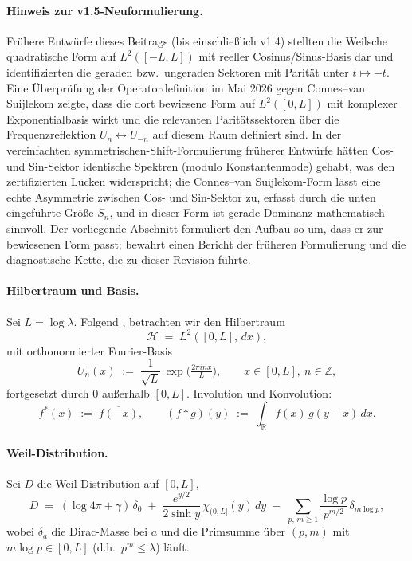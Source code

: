 \documentclass[11pt,a4paper]{article}
\theoremstyle{remark}
\theoremstyle{plain}
\begin{document}
\paragraph{Hinweis zur v1.5-Neuformulierung.}
Frühere Entwürfe dieses Beitrags (bis einschließlich v1.4) stellten die Weilsche quadratische Form auf $L^2([-L,L])$ mit reeller Cosinus/Sinus-Basis dar und identifizierten die geraden bzw.\ ungeraden Sektoren mit Parität unter $t\mapsto -t$. Eine Überprüfung der Operatordefinition im Mai 2026 gegen Connes--van Suijlekom \cite{ConnesvS2025} zeigte, dass die dort bewiesene Form auf $L^2([0,L])$ mit komplexer Exponentialbasis wirkt und die relevanten Paritätssektoren über die Frequenzreflektion $U_n\leftrightarrow U_{-n}$ auf diesem Raum definiert sind. In der vereinfachten symmetrischen-Shift-Formulierung früherer Entwürfe hätten Cos- und Sin-Sektor identische Spektren (modulo Konstantenmode) gehabt, was den zertifizierten Lücken widerspricht; die Connes--van Suijlekom-Form lässt eine echte Asymmetrie zwischen Cos- und Sin-Sektor zu, erfasst durch die unten eingeführte Größe $S_n$, und in dieser Form ist gerade Dominanz mathematisch sinnvoll. Der vorliegende Abschnitt formuliert den Aufbau so um, dass er zur bewiesenen Form passt;  bewahrt einen Bericht der früheren Formulierung und die diagnostische Kette, die zu dieser Revision führte.

\paragraph{Hilbertraum und Basis.} Sei $L=\log\lambda$. Folgend \cite[Sektion~4]{ConnesvS2025}, betrachten wir den Hilbertraum
\[
  \mathcal{H} \;=\; L^2([0,L],\,dx),
\]
mit orthonormierter Fourier-Basis
\[
  U_n(x) \;:=\; \frac{1}{\sqrt L}\,\exp\!\Big(\tfrac{2\pi i n x}{L}\Big),
  \qquad x\in[0,L],\ n\in\mathbb{Z},
\]
fortgesetzt durch $0$ außerhalb $[0,L]$. Involution und Konvolution:
\[
  f^*(x) \;:=\; \overline{f(-x)},
  \qquad
  (f * g)(y) \;:=\; \int_{\mathbb{R}} f(x)\,g(y-x)\,dx.
\]

\paragraph{Weil-Distribution.} Sei $D$ die Weil-Distribution auf $[0,L]$,
\begin{equation}
\label{eq:weil-distribution}
  D \;=\; (\log 4\pi + \gamma)\,\delta_0
     \;+\; \frac{e^{y/2}}{2\sinh y}\,\chi_{(0,L]}(y)\,dy
     \;-\; \sum_{p,\,m\geq 1}
           \frac{\log p}{p^{m/2}}\,\delta_{m\log p},
\end{equation}
wobei $\delta_a$ die Dirac-Masse bei $a$ und die Primsumme über $(p,m)$ mit $m\log p\in[0,L]$ (d.h.\ $p^m\le\lambda$) läuft.
\end{document}
